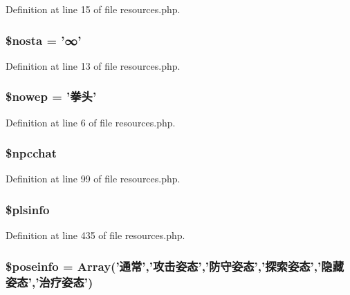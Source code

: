 Definition at line 15 of file resources.\+php.

\hypertarget{resources_8php_a1b178dce2c8c7c1f35b20c828d51de4a}{
\subsubsection[{\$nosta}]{\setlength{\rightskip}{0pt plus 5cm}\$nosta = '∞'}}\label{resources_8php_a1b178dce2c8c7c1f35b20c828d51de4a}


Definition at line 13 of file resources.\+php.

\hypertarget{resources_8php_a413d4ee11837afa83d33b1cd34244911}{
\subsubsection[{\$nowep}]{\setlength{\rightskip}{0pt plus 5cm}\$nowep = '拳头'}}\label{resources_8php_a413d4ee11837afa83d33b1cd34244911}


Definition at line 6 of file resources.\+php.

\hypertarget{resources_8php_a413262abf345c0466e9927a412571365}{
\subsubsection[{\$npcchat}]{\setlength{\rightskip}{0pt plus 5cm}\$npcchat}}\label{resources_8php_a413262abf345c0466e9927a412571365}


Definition at line 99 of file resources.\+php.

\hypertarget{resources_8php_a80fc03ebf0cae6b56b4e8f4738273199}{
\subsubsection[{\$plsinfo}]{\setlength{\rightskip}{0pt plus 5cm}\$plsinfo}}\label{resources_8php_a80fc03ebf0cae6b56b4e8f4738273199}


Definition at line 435 of file resources.\+php.

\hypertarget{resources_8php_af6cbbc5cff2f1db3093587d7495600ae}{
\subsubsection[{\$poseinfo}]{\setlength{\rightskip}{0pt plus 5cm}\$poseinfo = Array('通常','攻击姿态','防守姿态','探索姿态','隐藏姿态','治疗姿态')}}\label{resources_8php_af6cbbc5cff2f1db3093587d7495600ae}


